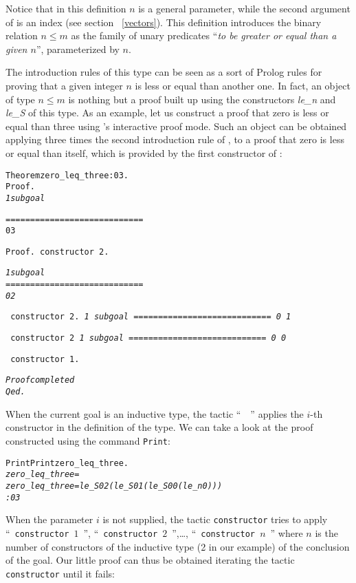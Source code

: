 \documentclass[11pt]{article}
\newcommand{\refmancite}[1]{{}}
\begin{document}
Notice that in this definition $n$ is a general parameter,
while the second argument of  is an index (see section
~\ref{vectors}).
 This definition
introduces the binary relation $n {\leq} m$ as the family of unary predicates
``\textsl{to be greater or equal than a given $n$}'', parameterized by $n$.

The introduction rules of this type can be seen as a sort of Prolog
rules for proving that a given integer $n$ is less or equal than another one.
In fact, an object of type $n{\leq} m$ is nothing but a proof
built up using the constructors \textsl{le\_n} and
\textsl{le\_S} of this type.  As an example, let us construct
a proof that zero is less or equal than three using {\coq}'s interactive
proof mode.
Such an object can be obtained applying three times the second
introduction rule of , to a proof that zero is less or equal
than itself,
which is provided by the first constructor of :

\begin{alltt}
Theorem zero_leq_three: 0 {\coqle} 3.
Proof.
\it{} 1 subgoal

============================
 0 {\coqle} 3

\tt{}Proof.
 constructor 2.

\it{} 1 subgoal
============================
  0 {\coqle} 2

\tt{} constructor 2.
\it{} 1 subgoal
============================
  0 {\coqle} 1

\tt{} constructor 2
\it{} 1 subgoal
============================
  0 {\coqle} 0

\tt{} constructor 1.

\it{}Proof completed
\tt{}Qed.
\end{alltt}

\noindent When
the current goal is an inductive type, the tactic
``~~'' \refmancite{Section \ref{constructor}} applies the $i$-th constructor in the
definition of the type. We can take a look at the proof constructed
using the command \texttt{Print}:

\begin{alltt}
Print Print zero_leq_three.
\it{}zero_leq_three =
zero_leq_three = le_S 0 2 (le_S 0 1 (le_S 0 0 (le_n 0)))
     : 0 {\coqle} 3
\end{alltt}

When the parameter $i$ is not supplied, the tactic \texttt{constructor}
tries to apply ``~\texttt{constructor $1$}~'', ``~\texttt{constructor $2$}~'',\dots,
``~\texttt{constructor $n$}~'' where $n$ is the number of constructors
of the inductive type (2 in our example) of the conclusion of the goal.
Our little proof can thus be obtained iterating the tactic
\texttt{constructor} until it fails:
\end{document}
